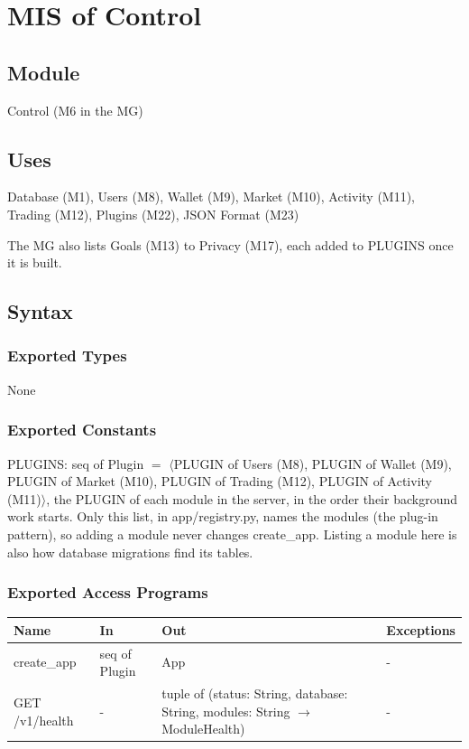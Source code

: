 \documentclass[12pt, titlepage]{article}
\begin{document}
\section{MIS of Control} \label{MisControl}

\subsection{Module}

Control (M6 in the MG)

\subsection{Uses}

Database (M1), Users (M8), Wallet (M9), Market (M10), Activity (M11),
Trading (M12), Plugins (M22), JSON Format (M23)

\medskip
\noindent The MG also lists Goals (M13) to Privacy (M17), each added to PLUGINS
once it is built.

\subsection{Syntax}

\subsubsection{Exported Types}

None

\subsubsection{Exported Constants}

\noindent PLUGINS: seq of Plugin $=$ $\langle$PLUGIN of Users (M8), PLUGIN of
Wallet (M9), PLUGIN of Market (M10), PLUGIN of Trading (M12), PLUGIN of
Activity (M11)$\rangle$, the
PLUGIN of each module in the server, in the order their background work
starts. Only this list, in app/registry.py, names the modules (the plug-in
pattern), so adding a module never changes create\_app. Listing a module here
is also how database migrations find its tables.

\subsubsection{Exported Access Programs}

\begin{center}
\begin{tabular}{p{3cm} p{2.4cm} >{\raggedright\arraybackslash}p{6.8cm} p{2.3cm}}
\toprule
\textbf{Name} & \textbf{In} & \textbf{Out} & \textbf{Exceptions} \\
\midrule
create\_app & seq of Plugin & App & - \\
GET /v1/health & - & tuple of (status: String, database: String, modules:
  String $\rightarrow$ ModuleHealth) & - \\
\bottomrule
\end{tabular}
\end{center}
\end{document}
